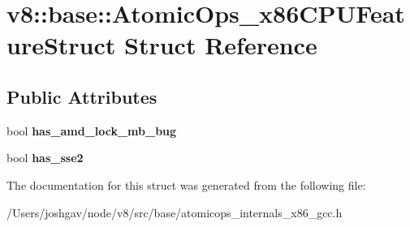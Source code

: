 \hypertarget{structv8_1_1base_1_1_atomic_ops__x86_c_p_u_feature_struct}{}\section{v8\+:\+:base\+:\+:Atomic\+Ops\+\_\+x86\+C\+P\+U\+Feature\+Struct Struct Reference}
\label{structv8_1_1base_1_1_atomic_ops__x86_c_p_u_feature_struct}
\subsection*{Public Attributes}
\begin{DoxyCompactItemize}
\item 
bool {\bfseries has\+\_\+amd\+\_\+lock\+\_\+mb\+\_\+bug}\hypertarget{structv8_1_1base_1_1_atomic_ops__x86_c_p_u_feature_struct_a6498ea77fa78c053546c3b1f3f11f13c}{}\label{structv8_1_1base_1_1_atomic_ops__x86_c_p_u_feature_struct_a6498ea77fa78c053546c3b1f3f11f13c}

\item 
bool {\bfseries has\+\_\+sse2}\hypertarget{structv8_1_1base_1_1_atomic_ops__x86_c_p_u_feature_struct_a5476d193ad7ba586d83577b245776efb}{}\label{structv8_1_1base_1_1_atomic_ops__x86_c_p_u_feature_struct_a5476d193ad7ba586d83577b245776efb}

\end{DoxyCompactItemize}


The documentation for this struct was generated from the following file\+:\begin{DoxyCompactItemize}
\item 
/\+Users/joshgav/node/v8/src/base/atomicops\+\_\+internals\+\_\+x86\+\_\+gcc.\+h\end{DoxyCompactItemize}
